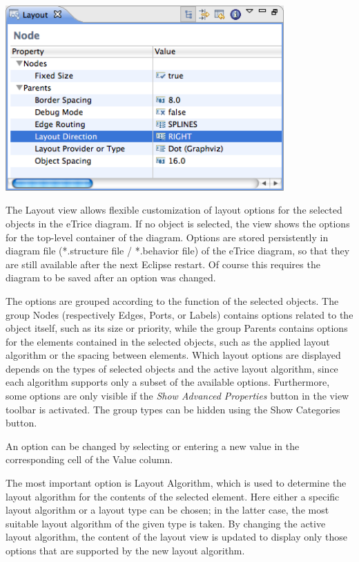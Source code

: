 \includegraphics[width=0.8\textwidth]{images/043-LayoutView.png}

The Layout view allows flexible customization of layout options for the selected objects in the eTrice diagram. If no object is selected, the view shows the options for the top-level container of the diagram. Options are stored persistently in diagram file (*.structure file / *.behavior file) of the eTrice diagram, so that they are still available after the next Eclipse restart. Of course this requires the diagram to be saved after an option was changed.

The options are grouped according to the function of the selected objects. The group Nodes (respectively Edges, Ports, or Labels) contains options related to the object itself, such as its size or priority, while the group Parents contains options for the elements contained in the selected objects, such as the applied layout algorithm or the spacing between elements. Which layout options are displayed depends on the types of selected objects and the active layout algorithm, since each algorithm supports only a subset of the available options. Furthermore, some options are only visible if the \textit{Show Advanced Properties} button in the view toolbar is activated. The group types can be hidden using the Show Categories button.

An option can be changed by selecting or entering a new value in the corresponding cell of the Value column.

The most important option is Layout Algorithm, which is used to determine the layout algorithm for the contents of the selected element. Here either a specific layout algorithm or a layout type can be chosen; in the latter case, the most suitable layout algorithm of the given type is taken. By changing the active layout algorithm, the content of the layout view is updated to display only those options that are supported by the new layout algorithm.

